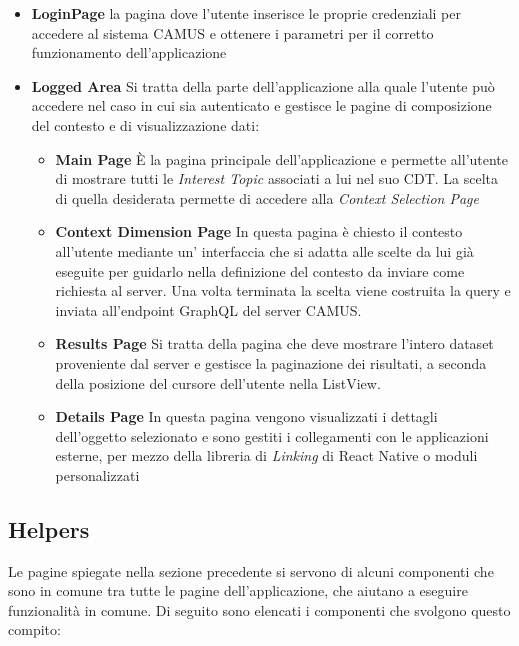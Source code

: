 \begin{itemize}
	\item \textbf{LoginPage} \upe la pagina dove l'utente inserisce le proprie credenziali per accedere al sistema CAMUS e ottenere i parametri per il corretto funzionamento dell'applicazione
	\item \textbf{Logged Area} Si tratta della parte dell'applicazione alla quale l'utente può accedere nel caso in cui sia autenticato e gestisce le pagine di composizione del contesto e di visualizzazione dati:
	\begin{itemize}
		\item \textbf{Main Page} È la pagina principale dell'applicazione e permette all'utente di mostrare tutti le \emph{Interest Topic} associati a lui nel suo CDT. La scelta di quella desiderata permette di accedere alla \emph{Context Selection Page}
		\item \textbf{Context Dimension Page} In questa pagina è chiesto il contesto all'utente mediante un' interfaccia che si adatta alle scelte da lui già eseguite per guidarlo nella definizione del contesto da inviare come richiesta al server. Una volta terminata la scelta viene costruita la query e inviata all'endpoint GraphQL del server CAMUS. 
		\item \textbf{Results Page} Si tratta della pagina che deve mostrare l'intero dataset proveniente dal server e gestisce la paginazione dei risultati, a seconda della posizione del cursore dell'utente nella ListView. 
		\item \textbf{Details Page} In questa pagina vengono visualizzati i dettagli dell'oggetto selezionato e sono gestiti i collegamenti con le applicazioni esterne, per mezzo della libreria di \emph{Linking} di React Native o moduli personalizzati
	\end{itemize}
\end{itemize}

\subsection{Helpers}
Le pagine spiegate nella sezione precedente si servono di alcuni componenti che sono in comune tra tutte le pagine dell'applicazione, che aiutano a eseguire funzionalità in comune. Di seguito sono elencati i componenti che svolgono questo compito:

